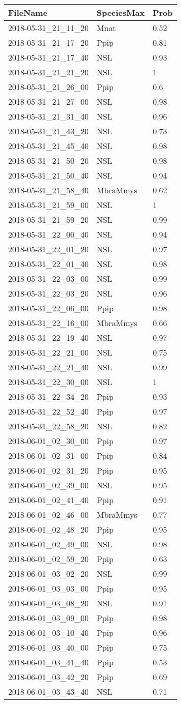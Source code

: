 \documentclass[]{article}
\begin{document}
\begin{longtable}[]{@{}lll@{}}
\toprule
FileName & SpeciesMax & Prob\tabularnewline
\midrule
\endhead
2018-05-31\_21\_11\_20 & Mnat & 0.52\tabularnewline
2018-05-31\_21\_17\_20 & Ppip & 0.81\tabularnewline
2018-05-31\_21\_17\_40 & NSL & 0.93\tabularnewline
2018-05-31\_21\_21\_20 & NSL & 1\tabularnewline
2018-05-31\_21\_26\_00 & Ppip & 0.6\tabularnewline
2018-05-31\_21\_27\_00 & NSL & 0.98\tabularnewline
2018-05-31\_21\_31\_40 & NSL & 0.96\tabularnewline
2018-05-31\_21\_43\_20 & NSL & 0.73\tabularnewline
2018-05-31\_21\_45\_40 & NSL & 0.98\tabularnewline
2018-05-31\_21\_50\_20 & NSL & 0.98\tabularnewline
2018-05-31\_21\_50\_40 & NSL & 0.94\tabularnewline
2018-05-31\_21\_58\_40 & MbraMmys & 0.62\tabularnewline
2018-05-31\_21\_59\_00 & NSL & 1\tabularnewline
2018-05-31\_21\_59\_20 & NSL & 0.99\tabularnewline
2018-05-31\_22\_00\_40 & NSL & 0.94\tabularnewline
2018-05-31\_22\_01\_20 & NSL & 0.97\tabularnewline
2018-05-31\_22\_01\_40 & NSL & 0.98\tabularnewline
2018-05-31\_22\_03\_00 & NSL & 0.99\tabularnewline
2018-05-31\_22\_03\_20 & NSL & 0.96\tabularnewline
2018-05-31\_22\_06\_00 & Ppip & 0.98\tabularnewline
2018-05-31\_22\_16\_00 & MbraMmys & 0.66\tabularnewline
2018-05-31\_22\_19\_40 & NSL & 0.97\tabularnewline
2018-05-31\_22\_21\_00 & NSL & 0.75\tabularnewline
2018-05-31\_22\_21\_40 & NSL & 0.99\tabularnewline
2018-05-31\_22\_30\_00 & NSL & 1\tabularnewline
2018-05-31\_22\_34\_20 & Ppip & 0.93\tabularnewline
2018-05-31\_22\_52\_40 & Ppip & 0.97\tabularnewline
2018-05-31\_22\_58\_20 & NSL & 0.82\tabularnewline
2018-06-01\_02\_30\_00 & Ppip & 0.97\tabularnewline
2018-06-01\_02\_31\_00 & Ppip & 0.84\tabularnewline
2018-06-01\_02\_31\_20 & Ppip & 0.95\tabularnewline
2018-06-01\_02\_39\_00 & NSL & 0.95\tabularnewline
2018-06-01\_02\_41\_40 & Ppip & 0.91\tabularnewline
2018-06-01\_02\_46\_00 & MbraMmys & 0.77\tabularnewline
2018-06-01\_02\_48\_20 & Ppip & 0.95\tabularnewline
2018-06-01\_02\_49\_00 & NSL & 0.98\tabularnewline
2018-06-01\_02\_59\_20 & Ppip & 0.63\tabularnewline
2018-06-01\_03\_02\_20 & NSL & 0.99\tabularnewline
2018-06-01\_03\_03\_00 & Ppip & 0.95\tabularnewline
2018-06-01\_03\_08\_20 & NSL & 0.91\tabularnewline
2018-06-01\_03\_09\_00 & Ppip & 0.98\tabularnewline
2018-06-01\_03\_10\_40 & Ppip & 0.96\tabularnewline
2018-06-01\_03\_40\_00 & Ppip & 0.75\tabularnewline
2018-06-01\_03\_41\_40 & Ppip & 0.53\tabularnewline
2018-06-01\_03\_42\_20 & Ppip & 0.69\tabularnewline
2018-06-01\_03\_43\_40 & NSL & 0.71\tabularnewline
\bottomrule
\end{longtable}
\end{document}
